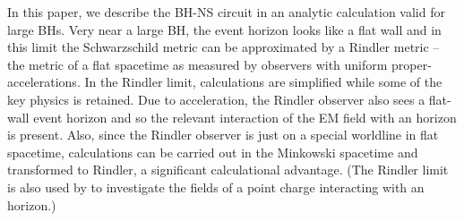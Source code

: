 In this paper, we describe the BH-NS circuit in an
analytic calculation valid for large BHs. Very near a large
BH, the event horizon looks like a flat wall and in this limit
the Schwarzschild metric can be approximated by a Rindler metric --
the metric of a
flat spacetime as measured by observers with uniform proper-accelerations. 
In the Rindler limit, calculations are simplified while
some of the key physics is retained.
Due to acceleration, the Rindler observer also sees a flat-wall 
event horizon and so the relevant interaction of the EM field with 
an horizon is present. Also, since the Rindler observer is just  on a special
worldline in flat spacetime, calculations can be carried out in the
Minkowski spacetime and transformed to Rindler, a significant
calculational advantage.
(The Rindler limit is also used by \citep{MP3_MS:1985} to investigate the fields of a point charge interacting with an horizon.)

